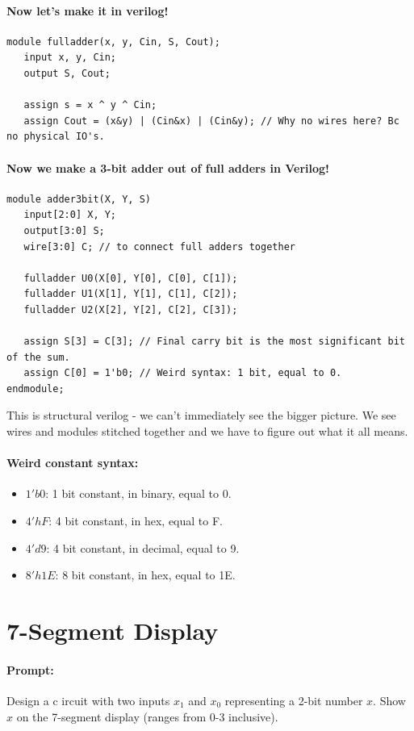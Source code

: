\documentclass[a4paper,12pt]{report}
\begin{document}
\paragraph{Now let's make it in verilog!}
\begin{lstlisting}
module fulladder(x, y, Cin, S, Cout);
   input x, y, Cin;
   output S, Cout;

   assign s = x ^ y ^ Cin;
   assign Cout = (x&y) | (Cin&x) | (Cin&y); // Why no wires here? Bc no physical IO's.
\end{lstlisting}

\paragraph{Now we make a 3-bit adder out of full adders in Verilog!}
\begin{lstlisting}
module adder3bit(X, Y, S)
   input[2:0] X, Y;
   output[3:0] S;
   wire[3:0] C; // to connect full adders together

   fulladder U0(X[0], Y[0], C[0], C[1]);
   fulladder U1(X[1], Y[1], C[1], C[2]);
   fulladder U2(X[2], Y[2], C[2], C[3]);

   assign S[3] = C[3]; // Final carry bit is the most significant bit of the sum.
   assign C[0] = 1'b0; // Weird syntax: 1 bit, equal to 0.
endmodule;
\end{lstlisting}

This is structural verilog - we can't immediately see the bigger picture. We see wires and 
modules stitched together and we have to figure out what it all means.

\paragraph{Weird constant syntax: }
\begin{itemize}
\item $1'b0$: 1 bit constant, in binary, equal to 0.
\item $4'hF$: 4 bit constant, in hex, equal to F.
\item $4'd9$: 4 bit constant, in decimal, equal to 9.
\item $8'h1E$: 8 bit constant, in hex, equal to 1E.
\end{itemize}

\section{7-Segment Display}
\paragraph{Prompt: } Design a c ircuit with two inputs $x_1$ and $x_0$ representing a 
2-bit number $x$. Show $x$ on the 7-segment display (ranges from 0-3 inclusive).
\end{document}
